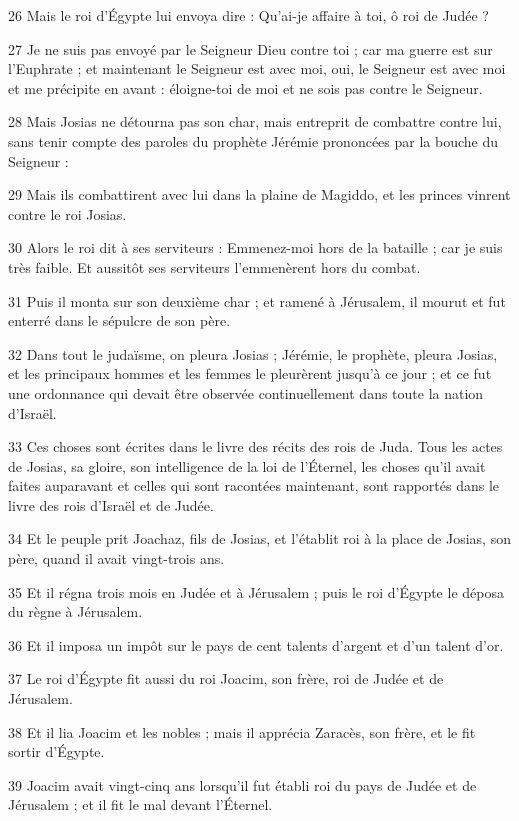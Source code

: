 \par 26 Mais le roi d'Égypte lui envoya dire : Qu'ai-je affaire à toi, ô roi de Judée ?
\par 27 Je ne suis pas envoyé par le Seigneur Dieu contre toi ; car ma guerre est sur l'Euphrate ; et maintenant le Seigneur est avec moi, oui, le Seigneur est avec moi et me précipite en avant : éloigne-toi de moi et ne sois pas contre le Seigneur.
\par 28 Mais Josias ne détourna pas son char, mais entreprit de combattre contre lui, sans tenir compte des paroles du prophète Jérémie prononcées par la bouche du Seigneur :
\par 29 Mais ils combattirent avec lui dans la plaine de Magiddo, et les princes vinrent contre le roi Josias.
\par 30 Alors le roi dit à ses serviteurs : Emmenez-moi hors de la bataille ; car je suis très faible. Et aussitôt ses serviteurs l'emmenèrent hors du combat.
\par 31 Puis il monta sur son deuxième char ; et ramené à Jérusalem, il mourut et fut enterré dans le sépulcre de son père.
\par 32 Dans tout le judaïsme, on pleura Josias ; Jérémie, le prophète, pleura Josias, et les principaux hommes et les femmes le pleurèrent jusqu'à ce jour ; et ce fut une ordonnance qui devait être observée continuellement dans toute la nation d'Israël.
\par 33 Ces choses sont écrites dans le livre des récits des rois de Juda. Tous les actes de Josias, sa gloire, son intelligence de la loi de l'Éternel, les choses qu'il avait faites auparavant et celles qui sont racontées maintenant, sont rapportés dans le livre des rois d'Israël et de Judée.
\par 34 Et le peuple prit Joachaz, fils de Josias, et l'établit roi à la place de Josias, son père, quand il avait vingt-trois ans.
\par 35 Et il régna trois mois en Judée et à Jérusalem ; puis le roi d'Égypte le déposa du règne à Jérusalem.
\par 36 Et il imposa un impôt sur le pays de cent talents d'argent et d'un talent d'or.
\par 37 Le roi d'Égypte fit aussi du roi Joacim, son frère, roi de Judée et de Jérusalem.
\par 38 Et il lia Joacim et les nobles ; mais il apprécia Zaracès, son frère, et le fit sortir d'Égypte.
\par 39 Joacim avait vingt-cinq ans lorsqu'il fut établi roi du pays de Judée et de Jérusalem ; et il fit le mal devant l'Éternel.
